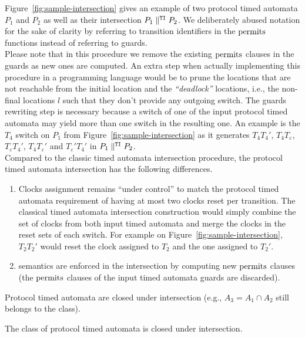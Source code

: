 Figure~\ref{fig:sample-intersection} gives an example of two protocol timed automata $P_1$ and $P_2$ as well as their intersection $P_1 \parallel^{\mathtt{TI}} P_2$. We deliberately abused notation for the sake of clarity by referring to transition identifiers in the $\operatorname{permits}$ functions instead of referring to guards.\\

Please note that in this procedure we remove the existing $\operatorname{permits}$ clauses in the guards as new ones are computed.
An extra step when actually implementing this procedure in a programming language would be to prune the locations that are not reachable from the initial location and the \emph{``deadlock''} locations, i.e., the non-final locations $l$ such that they don't provide any outgoing switch. The guards rewriting step is necessary because a switch of one of the input protocol timed automata may yield more than one switch in the resulting one. An example is the $T_4$ switch on $P_1$ from Figure~\ref{fig:sample-intersection} as it generates $T_4T_4'$, $T_4T_\varepsilon$, $T_\varepsilon T_4'$, $T_4T_\varepsilon'$ and $T_\varepsilon' T_4'$ in $P_1 \parallel^{\mathtt{TI}} P_2$. \\

Compared to the classic timed automata intersection procedure, the protocol timed automata intersection has the following differences.
\begin{enumerate}
  
  \item Clocks assignment remains ``under control'' to match the protocol timed automata requirement of having at most two clocks reset per transition. The classical timed automata intersection construction would simply combine the set of clocks from both input timed automata and merge the clocks in the reset sets of each switch. For example on Figure~\ref{fig:sample-intersection}, $T_2T_2'$ would reset the clock assigned to $T_2$ and the one assigned to $T_2'$.
  
  \item \MInvoke semantics are enforced in the intersection by computing new $\operatorname{permits}$ clauses (the $\operatorname{permits}$ clauses of the input timed automata guards are discarded).
  
\end{enumerate}

Protocol timed automata are closed under intersection (e.g., $A_3 = A_1 \cap A_2$ still belongs to the class).

\begin{theorem}
The class of protocol timed automata is closed under intersection.
\label{thm:closure-intersection}
\end{theorem}

